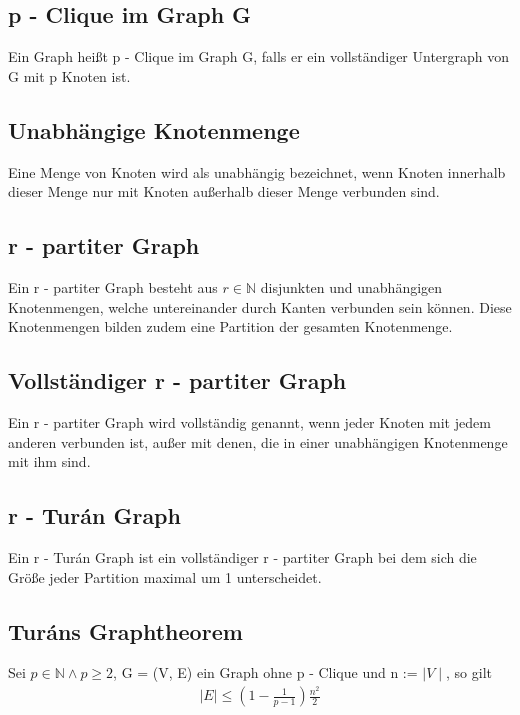 \documentclass[12pt, a4paper]{article}
\begin{document}
\subsection{p - Clique im Graph G}
\label{theorem:p-clique-im-graph-g}
Ein Graph heißt p - Clique im Graph G, falls er ein vollständiger Untergraph von G mit p Knoten ist.


\subsection{Unabhängige Knotenmenge}
\label{theorem:unabhangige-knotenmenge}
Eine Menge von Knoten wird als unabhängig bezeichnet, wenn Knoten innerhalb dieser Menge nur mit Knoten außerhalb dieser Menge verbunden sind.


\subsection{r - partiter Graph}
\label{theorem:r-partiter-graph}
Ein r - partiter Graph besteht aus $r \in \mathbb{N}$  disjunkten und unabhängigen Knotenmengen, welche untereinander durch Kanten verbunden sein können. Diese Knotenmengen bilden zudem eine Partition der gesamten Knotenmenge.


\subsection{Vollständiger r - partiter Graph}
\label{theorem:vollstandiger-r-partiter-graph}
Ein r - partiter Graph wird vollständig genannt, wenn jeder Knoten mit jedem anderen verbunden ist, außer mit denen, die in einer unabhängigen Knotenmenge mit ihm sind.


\subsection{r - Turán Graph}
\label{theorem:turan-graph}
Ein r - Turán Graph ist ein vollständiger r - partiter Graph bei dem sich die Größe jeder Partition maximal um 1 unterscheidet.


\subsection{Turáns Graphtheorem}
Sei $p \in \mathbb{N} \wedge p \ge 2$,  G = (V, E) ein Graph ohne p - Clique und n := $\mid V \mid$, so gilt
\begin{align} 
\mid E \mid \le (1- \frac{1}{p-1}) \frac{n^2}{2}
\end{align}
\end{document}
